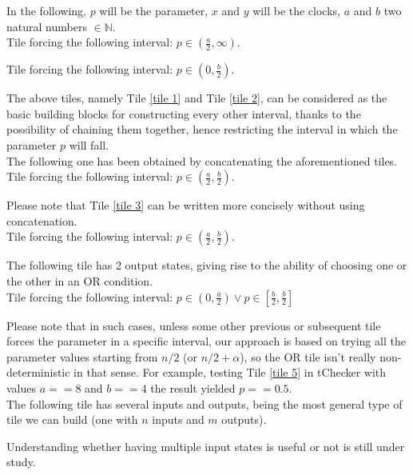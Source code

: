 \documentclass[12pt, a4paper]{article}
\begin{document}

\noindent
In the following, $p$ will be the parameter, $x$ and $y$ will be the clocks, $a$ and $b$ two natural numbers $\in \mathbb{N}$.\\

Tile forcing the following interval: $p \in (\frac{a}{2}, \infty)$.



\bigskip

Tile forcing the following interval: $p \in (0, \frac{b}{2})$.



\noindent
The above tiles, namely Tile \ref{tile 1} and Tile \ref{tile 2}, can be considered as the basic building blocks for constructing every other interval, thanks to the possibility of chaining them together, hence restricting the interval in which the parameter $p$ will fall.\\

\noindent
The following one has been obtained by concatenating the aforementioned tiles.\\

Tile forcing the following interval: $p \in (\frac{a}{2}, \frac{b}{2})$.



\noindent
Please note that Tile \ref{tile 3} can be written more concisely without using concatenation.\\

Tile forcing the following interval: $p \in (\frac{a}{2}, \frac{b}{2})$.



\newpage

\noindent
The following tile has 2 output states, giving rise to the ability of choosing one or the other in an OR condition.\\

Tile forcing the following interval: $p \in (0, \frac{a}{2}) \vee p \in [\frac{b}{2}, \frac{b}{2}]$



\noindent
Please note that in such cases, unless some other previous or subsequent tile forces the parameter in a specific interval, our approach is based on trying all the parameter values starting from $n /2$ (or $n / 2 + \alpha$), so the OR tile isn't really non-deterministic in that sense. For example, testing Tile \ref{tile 5} in tChecker with values $a == 8$ and $b == 4$ the result yielded $p == 0.5$.\\

\noindent
The following tile has several inputs and outputs, being the most general type of tile we can build (one with $n$ inputs and $m$ outputs).



\noindent
Understanding whether having multiple input states is useful or not is still under study.
\end{document}
